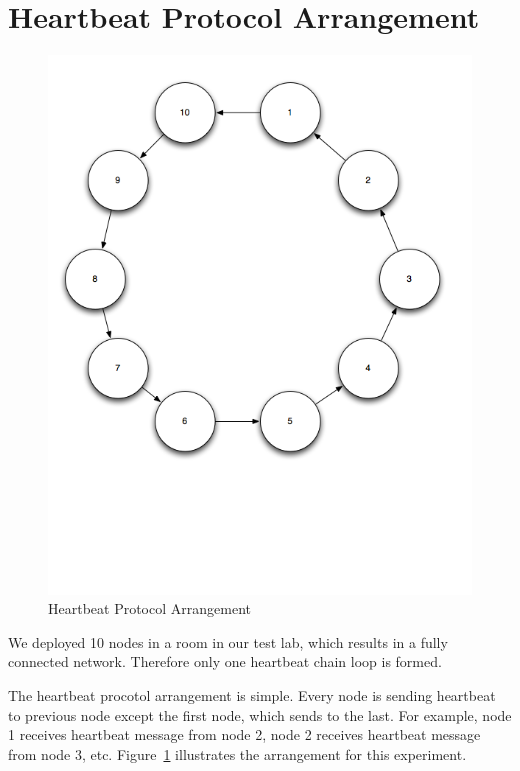 \section{Heartbeat Protocol Arrangement}

\begin{figure}[h!]
\caption{Heartbeat Protocol Arrangement}
\label{fig:heartbeat-protocol-arrangement}
\centering
    \includegraphics[width=\linewidth]{figures/heartbeat-protocol-arrangement}
\end{figure}

We deployed 10 nodes in a room in our test lab, which results in a fully
connected network. Therefore only one heartbeat chain loop is formed.

The heartbeat procotol arrangement is simple. Every node is sending heartbeat to
previous node except the first node, which sends to the last. For example, node
1 receives heartbeat message from node 2, node 2 receives heartbeat message from
node 3, etc. Figure~\ref{fig:heartbeat-protocol-arrangement} illustrates the
arrangement for this experiment.


